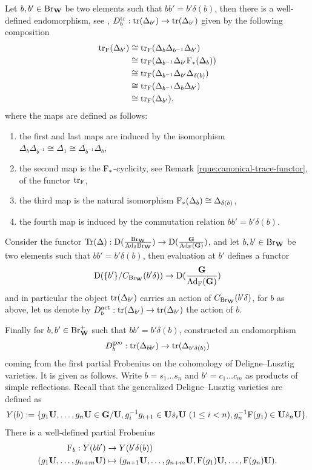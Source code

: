\documentclass[article, 10pt, oneside, reqno]{amsart}
\theoremstyle{plain}
\theoremstyle{definition}
\theoremstyle{remark}
\begin{document}
Let $b,b' \in \mathrm{Br}_{\mathbf{W}}$ be two elements such that $bb' = b'\delta(b)$, then there is a well-defined endomorphism, see \cite[Section 4.1]{BonnafeDudasRouquier}, $D_b^{\mathrm{tr}} : \mathrm{tr}(\Delta_{b'}) \to \mathrm{tr}(\Delta_{b'})$ given by the following composition
\begin{align*}
\mathrm{tr}_{\mathrm{F}}(\Delta_{b'}) &\cong \mathrm{tr}_{\mathrm{F}}(\Delta_{b}\Delta_{b^{-1}}\Delta_{b'}) \\
&\cong \mathrm{tr}_{\mathrm{F}}(\Delta_{b^{-1}}\Delta_{b'}\mathrm{F}_*(\Delta_b)) \\
&\cong \mathrm{tr}_{\mathrm{F}}(\Delta_{b^{-1}}\Delta_{b'}\Delta_{\delta(b)}) \\
&\cong \mathrm{tr}_{\mathrm{F}}(\Delta_{b^{-1}}\Delta_{b}\Delta_{b'}) \\
&\cong \mathrm{tr}_{\mathrm{F}}(\Delta_{b'}), 
\end{align*}
where the maps are defined as follows:
\begin{enumerate}
\item the first and last maps are induced by the isomorphism $\Delta_{b}\Delta_{b^{-1}} \cong \Delta_1 \cong \Delta_{b^{-1}}\Delta_{b}$, 
\item the second map is the $\mathrm{F}_*$-cyclicity, see Remark \ref{rque:canonical-trace-functor}, of the functor $\mathrm{tr}_{\mathrm{F}}$, 
\item the third map is the natural isomorphism $\mathrm{F}_*(\Delta_b) \cong \Delta_{\delta(b)}$, 
\item the fourth map is induced by the commutation relation $bb' = b'\delta(b)$. 
\end{enumerate}

Consider the functor $\mathrm{Tr}(\Delta) : \mathrm{D}(\frac{\mathrm{Br}_{\mathbf{W}}}{\mathrm{Ad}_{\delta}\mathrm{Br}_{\mathbf{W}}}) \to \mathrm{D}(\frac{\mathbf{G}}{\mathrm{Ad}_{\mathrm{F}}(\mathbf{G})})$, and let $b,b' \in \mathrm{Br}_{\mathbf{W}}$ be two elements such that $bb' = b'\delta(b)$, then evaluation at $b'$ defines a functor
$$\mathrm{D}(\{b'\}/C_{\mathrm{Br}_{\mathbf{W}}}(b'\delta)) \to \mathrm{D}(\frac{\mathbf{G}}{\mathrm{Ad}_{\mathrm{F}}(\mathbf{G})})$$
and in particular the object $\mathrm{tr}(\Delta_{b'})$ carries an action of $C_{\mathrm{Br}_{\mathbf{W}}}(b'\delta)$, for $b$ as above, let us denote by $D_b^{\mathrm{act}} : \mathrm{tr}(\Delta_{b'}) \to \mathrm{tr}(\Delta_{b'})$ the action of $b$. 

Finally for $b,b' \in \mathrm{Br}_{\mathbf{W}}^+$ such that $bb' = b'\delta(b)$, \cite{BroueMichelActionRegularElements} constructed an endomorphism 
$$D_b^{\mathrm{geo}} : \mathrm{tr}(\Delta_{bb'}) \to \mathrm{tr}(\Delta_{b'\delta(b)})$$
coming from the first partial Frobenius on the cohomology of Deligne--Lusztig varieties. It is given as follows. Write $b = s_1\dots s_n$ and $b' = c_1\dots c_m$ as products of simple reflections. Recall that the generalized Deligne--Lusztig varieties are defined as 
$$Y(b) := \{g_1\mathbf{U}, \dots, g_n\mathbf{U} \in \mathbf{G}/\mathbf{U}, g_i^{-1}g_{i+1} \in \mathbf{U} \dot{s}_i \mathbf{U}\ (1\leq i<n), g_n^{-1}\mathrm{F}(g_1) \in \mathbf{U}\dot{s}_n\mathbf{U} \}.$$
There is a well-defined partial Frobenius 
\begin{align*}
\mathrm{F}_b : Y(bb') &\to Y(b'\delta(b)) \\
(g_1\mathbf{U}, \dots, g_{n+m}\mathbf{U}) &\mapsto (g_{n+1}\mathbf{U}, \dots, g_{n+m}\mathbf{U}, \mathrm{F}(g_1)\mathbf{U}, \dots, \mathrm{F}(g_n)\mathbf{U}).
\end{align*}
\end{document}
